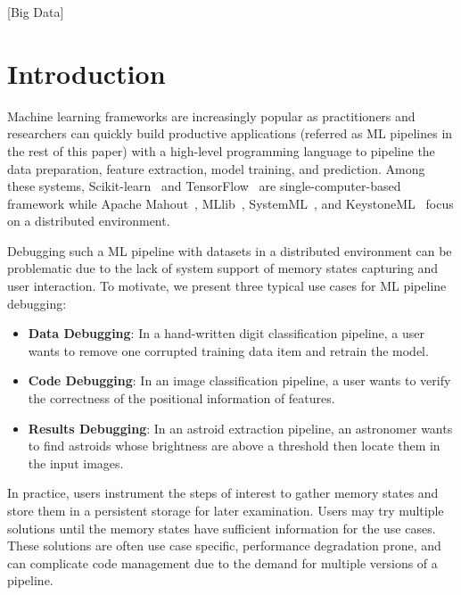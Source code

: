 \documentclass{sig-alternate}
\newenvironment{shortlist}{
        \vspace*{-0.5em}
  \begin{itemize}
  \setlength{\itemsep}{-0.1em}
}{
  \end{itemize}
        \vspace*{-0.5em}
}
\begin{document}
[Big Data]

\section{Introduction}
Machine learning frameworks are increasingly popular as practitioners and researchers can quickly
build productive applications (referred as ML pipelines in the rest of this paper) with a high-level 
programming language to pipeline the data preparation, feature extraction, model training, 
and prediction. 
Among these systems, Scikit-learn~\cite{pedregosa2011scikit} and TensorFlow~\cite{tensorflow15} 
are single-computer-based framework while Apache Mahout~\cite{owen2011mahout}, MLlib~\cite{meng2015mllib}, 
SystemML~\cite{ghoting11systemml}, and KeystoneML~\cite{sparks15} focus on a distributed environment.

Debugging such a ML pipeline with datasets in a distributed environment can be problematic due to
the lack of system support of memory states capturing and user interaction.
To motivate, we present three typical use cases for ML pipeline debugging:
\begin{shortlist}
\item{\bf Data Debugging}: In a hand-written digit classification pipeline, a user wants to remove one
corrupted training data item and retrain the model.
\item{\bf Code Debugging}: In an image classification pipeline, a user wants to verify the correctness of 
the positional information of features. 
\item{\bf Results Debugging}: In an astroid extraction pipeline, an astronomer wants to find astroids whose
brightness are above a threshold then locate them in the input images.
\end{shortlist}

In practice, users instrument the steps of interest to gather memory states and store them in a persistent storage
for later examination. Users may try multiple solutions until the memory states have sufficient information for the
use cases. These solutions are often use case specific, performance degradation prone, and can complicate code
management due to the demand for multiple versions of a pipeline.
\end{document}
